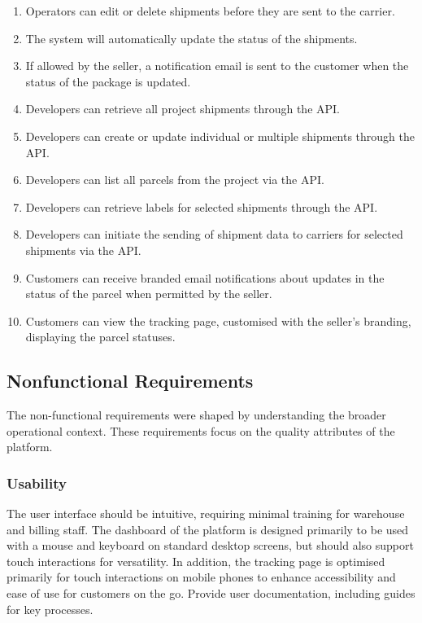\begin{enumerate}[label=\bfseries FR\arabic*:,leftmargin=*]
    \item Operators can edit or delete shipments before they are sent to the carrier.
    \item The system will automatically update the status of the shipments.
    \item If allowed by the seller, a notification email is sent to the customer when the status of the package is updated.
    \item Developers can retrieve all \gls{project} shipments through the API.
    \item Developers can create or update individual or multiple shipments through the API.
    \item Developers can list all parcels from the \gls{project} via the API.
    \item Developers can retrieve labels for selected shipments through the API.
    \item Developers can initiate the sending of shipment data to carriers for selected shipments via the API.
    \item Customers can receive branded email notifications about updates in the status of the parcel when permitted by the \gls{seller}.
    \item Customers can view the tracking page, customised with the seller's branding, displaying the parcel statuses.
\end{enumerate}

\subsection{Nonfunctional Requirements}
\label{subsec:nonfunctional-requirements}
The non-functional requirements were shaped by understanding the broader operational context.
These requirements focus on the quality attributes of the platform.

\subsubsection{Usability}
The user interface should be intuitive, requiring minimal training for warehouse and billing staff.
The dashboard of the platform is designed primarily to be used with a mouse and keyboard on standard desktop screens, but should also support touch interactions for versatility.
In addition, the tracking page is optimised primarily for touch interactions on mobile phones to enhance accessibility and ease of use for customers on the go. 
Provide user documentation, including guides for key processes.


